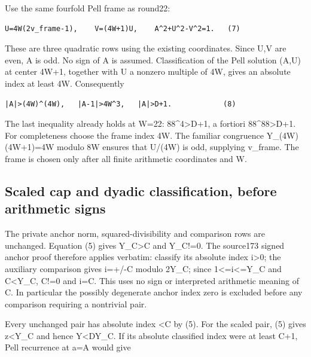 Use the same fourfold Pell frame as round22:

\begin{verbatim}
U=4W(2v_frame-1),    V=(4W+1)U,    A^2+U^2-V^2=1.   (7)
\end{verbatim}

These are three quadratic rows using the existing coordinates. Since U,V
are even, A is odd. No sign of A is assumed. Classification of the Pell
solution (\textbar A\textbar,\textbar U\textbar) at center 4W+1,
together with U a nonzero multiple of 4W, gives an absolute index at
least 4W. Consequently

\begin{verbatim}
|A|>(4W)^(4W),   |A-1|>4W^3,   |A|>D+1.            (8)
\end{verbatim}

The last inequality already holds at W=22: 88\^{}4\textgreater D+1, a
fortiori 88\^{}88\textgreater D+1. For completeness choose the frame
index 4W. The familiar congruence Y\_(4W)(4W+1)=4W modulo 8W ensures
that U/(4W) is odd, supplying v\_frame. The frame is chosen only after
all finite arithmetic coordinates and W.

\subsection{Scaled cap and dyadic classification, before arithmetic
signs}\label{scaled-cap-and-dyadic-classification-before-arithmetic-signs}

The private anchor norm, squared-divisibility and comparison rows are
unchanged. Equation (5) gives
\textbar Y\_C\textbar\textgreater\textbar C\textbar{} and Y\_C!=0. The
source173 signed anchor proof therefore applies verbatim: classify its
absolute index i\textgreater0; the auxiliary comparison gives i=+/-C
modulo 2\textbar Y\_C\textbar; since
1\textless=i\textless=\textbar Y\_C\textbar{} and
\textbar C\textbar\textless\textbar Y\_C\textbar, C!=0 and
i=\textbar C\textbar. This uses no sign or interpreted arithmetic
meaning of C. In particular the possibly degenerate anchor index zero is
excluded before any comparison requiring a nontrivial pair.

Every unchanged pair has absolute index \textless\textbar C\textbar{} by
(5). For the scaled pair, (5) gives
\textbar z\textbar\textless\textbar Y\_C\textbar{} and hence
\textbar Y\textbar\textless D\textbar Y\_C\textbar. If its absolute
classified index were at least \textbar C\textbar+1, Pell recurrence at
a=\textbar A\textbar{} would give

